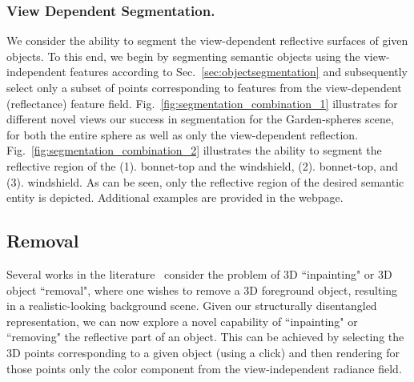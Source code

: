 \subsubsection{View Dependent Segmentation.}                                                                              


We consider the ability to segment the view-dependent reflective surfaces of given objects. 
To this end, we begin by segmenting semantic objects using the view-independent features according to Sec.~\ref{sec:objectsegmentation} and subsequently select only a subset of points corresponding to features from the view-dependent (reflectance) feature field. 
Fig.~\ref{fig:segmentation_combination_1} illustrates for different novel views our success in segmentation for the Garden-spheres scene, for both the entire sphere as well as only the view-dependent reflection. 
Fig.~\ref{fig:segmentation_combination_2} illustrates the ability to segment the reflective region of the (1). bonnet-top and the windshield, (2). bonnet-top, and (3). windshield. 
As can be seen, only the reflective region of the desired semantic entity is depicted. 
Additional examples 
are provided in the webpage. 











\subsection{Removal}




















Several works in the literature~\cite{mirzaei2023spin, weder2023removing, wang2023inpaintnerf360} consider the problem of 3D ``inpainting" or 3D object ``removal", where one wishes to remove a 3D foreground object, resulting in a realistic-looking background scene. Given our structurally disentangled representation, we can now explore a novel capability of ``inpainting" or ``removing" the reflective part of an object. This can be achieved by selecting the 3D points corresponding to a given object (using a click) and then rendering for those points only the color component from the view-independent radiance field.

